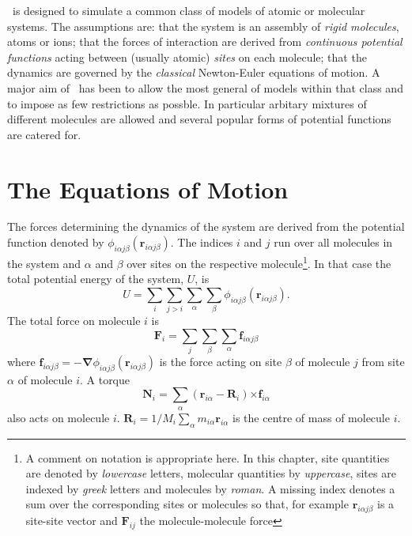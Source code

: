 \moldy\  is designed to simulate a common class of models of atomic or
molecular systems. The assumptions are: that the system is an assembly
of  {\em rigid   molecules},  atoms   or  ions;  that  the  forces  of
interaction are derived   from {\em  continuous  potential  functions}
acting between (usually atomic) {\em sites} on each molecule; that the
dynamics are governed by the {\em classical} Newton-Euler equations of
motion.  A major aim of \moldy\ has been to allow the most  general of
models within that class and to impose as few restrictions as possble.
In particular arbitary mixtures of different molecules are allowed
and several popular forms of potential functions are catered for.

\section{The Equations of Motion}
The forces determining the dynamics of the system are derived from the
potential    function    denoted     by   $\phi_{i\alpha  j\beta}(\bm{r}
_{i\alpha j\beta})$.  The indices $i$ and $j$ run  over all molecules
in the system and  $\alpha$ and $\beta$ over  sites on  the respective
molecule\footnote{A comment on notation is appropriate here.  In this
chapter, site quantities are denoted by {\em lowercase} letters,
molecular quantities by {\em uppercase}, sites are indexed by {\em greek}
letters and molecules by {\em roman}. A missing index denotes
a sum over the corresponding sites or molecules so that, for example
$\bm{r}_{i\alpha j\beta}$ is a site-site vector and $\bm{F}_{ij}$ the
molecule-molecule force}.  
In that case the total potential energy of the system, $U$, is
\begin{equation}
U = \sum_i \sum_{j > i} \sum_\alpha \sum_\beta \phi_{i\alpha j\beta}(
\bm{r}_{i\alpha j\beta}).
\end{equation}
The total force on molecule $i$ is
\begin{equation}
\label{eqn:comf}
\bm{F}_i = \sum_j \sum_\beta \sum_\alpha \bm{f}_{i\alpha j\beta}
\end{equation}
where $\bm{f}_{i\alpha j\beta} = - \bm{\nabla} \phi_{i\alpha  j\beta}(
\bm{r}_{i\alpha j\beta})$ is the force acting on site $\beta$ of molecule
$j$ from site $\alpha$ of molecule $i$.  A torque
\begin{equation}
\label{eqn:comt}
\bm{N}_i = \sum_\alpha (\bm{r}_{i \alpha} - \bm{R}_{i}) 
\bm{\times f}_{i\alpha} 
\end{equation}
also acts on molecule $i$.  $\bm{R}_{i} = 1/M_i \sum_\alpha
m_{i\alpha} \bm{r}_{i\alpha}$ is the centre of mass of molecule $i$.


